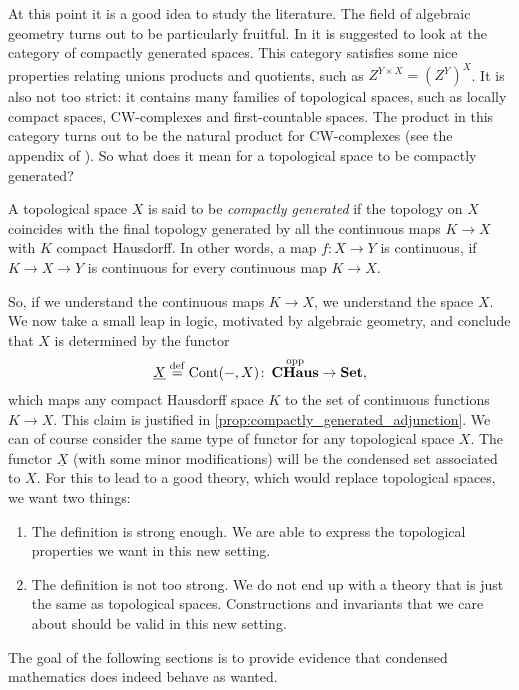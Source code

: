\documentclass{article}
\DeclareMathOperator{\opp}{opp}
\DeclareMathOperator{\Cont}{Cont}
\DeclareMathOperator{\CHaus}{\mathbf{CHaus}}
\begin{document}
At this point it is a good idea to study the literature.
The field of algebraic geometry turns out to be particularly
fruitful. In \cite{Steenrod1967ConvenientCT} it is suggested
to look at the category of compactly generated
spaces. This category satisfies some nice properties
relating unions products and quotients, such as $Z^{Y\times X} = (Z^Y)^X$.
It is also not too strict: it contains
many families of topological spaces, such as locally compact
spaces, CW-complexes and first-countable spaces. The product in this
category turns out to be the natural product for CW-complexes
(see the appendix of \cite{Hat2002AlgebraicT}).
So what does it mean for a topological space to be compactly generated?
\begin{definition}
    A topological space $X$ is said to be \emph{compactly generated}
    if the topology on $X$ coincides with the final topology generated
    by all the continuous maps $K \to X$ with $K$ compact Hausdorff.
    In other words, a map $f\colon X \to Y$ is continuous, if
    $K \to X \to Y$ is continuous for every continuous map $K \to X$.
\end{definition}
So, if we understand the continuous maps $K \to X$, we understand
the space $X$. We now take a small leap in logic, motivated by algebraic
geometry, and conclude that $X$ is determined by the functor
\begin{equation*}
    \underline{X} \defeq \Cont(-, X) \colon \CHaus^{\opp} \to \Set,
\end{equation*}
which maps any compact Hausdorff space $K$ to the set of
continuous functions $K \to X$. This claim is justified in
\cref{prop:compactly_generated_adjunction}. We can of course
consider the same type of functor for any topological space
$X$. The functor $\underline{X}$ (with some minor modifications)
will be the condensed set
associated to $X$. For this to lead to a good theory, which
would replace topological spaces, we want two things:
\begin{enumerate}
    \item The definition is strong enough. We are able
          to express the topological properties we want in this
          new setting.
    \item The definition is not too strong. We do not
          end up with a theory that is just the same as topological spaces.
          Constructions and invariants that we care about should be
          valid in this new setting.
\end{enumerate}
The goal of the following sections is to provide evidence
that condensed mathematics does indeed behave as wanted.
\end{document}
